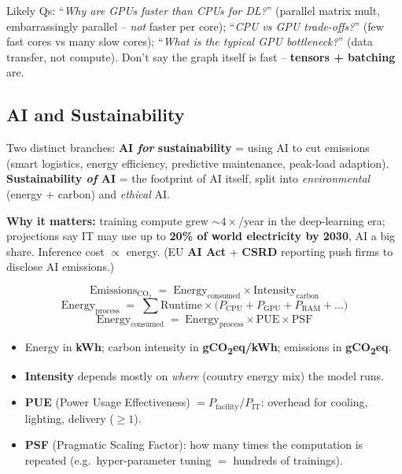 \documentclass[10pt,a4paper]{article}
\begin{document}
	\begin{examtipbox}
		Likely Qs: ``\emph{Why are GPUs faster than CPUs for DL?}'' (parallel matrix mult, embarrassingly parallel -- \emph{not} faster per core); ``\emph{CPU vs GPU trade-offs?}'' (few fast cores vs many slow cores); ``\emph{What is the typical GPU bottleneck?}'' (data transfer, not compute). Don't say the graph itself is fast -- \textbf{tensors + batching} are.
	\end{examtipbox}

	\subsection{AI and Sustainability}

	\begin{definitionbox}
		Two distinct branches: \textbf{AI \emph{for} sustainability} = using AI to cut emissions (smart logistics, energy efficiency, predictive maintenance, peak-load adaption). \textbf{Sustainability \emph{of} AI} = the footprint of AI itself, split into \emph{environmental} (energy + carbon) and \emph{ethical} AI.
	\end{definitionbox}

	\textbf{Why it matters:} training compute grew $\sim\!4\times$/year in the deep-learning era; projections say IT may use up to \textbf{20\% of world electricity by 2030}, AI a big share. Inference cost $\propto$ energy. (EU \textbf{AI Act} + \textbf{CSRD} reporting push firms to disclose AI emissions.)

	\begin{formulabox}
		\[ \text{Emissions}_{\text{CO}_2} \;=\; \text{Energy}_{\text{consumed}} \times \text{Intensity}_{\text{carbon}} \]
		\[ \text{Energy}_{\text{process}} \;=\; \textstyle\sum \text{Runtime} \times \big(P_{\text{CPU}} + P_{\text{GPU}} + P_{\text{RAM}} + \dots\big) \]
		\[ \text{Energy}_{\text{consumed}} \;=\; \text{Energy}_{\text{process}} \times \text{PUE} \times \text{PSF} \]
	\end{formulabox}
	\begin{itemize}[leftmargin=*]
		\item Energy in \textbf{kWh}; carbon intensity in \textbf{gCO\textsubscript{2}eq/kWh}; emissions in \textbf{gCO\textsubscript{2}eq}.
		\item \textbf{Intensity} depends mostly on \emph{where} (country energy mix) the model runs.
		\item \textbf{PUE} (Power Usage Effectiveness) $= P_{\text{facility}}/P_{\text{IT}}$: overhead for cooling, lighting, delivery ($\geq 1$).
		\item \textbf{PSF} (Pragmatic Scaling Factor): how many times the computation is repeated (e.g.\ hyper-parameter tuning $=$ hundreds of trainings).
	\end{itemize}
\end{document}
